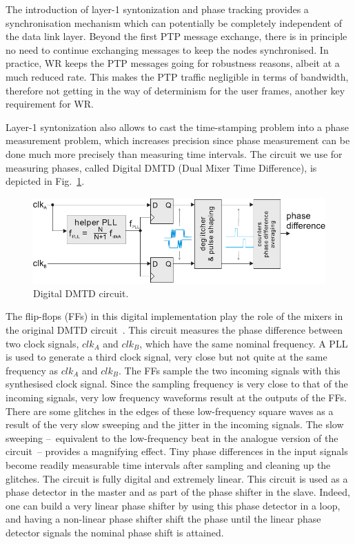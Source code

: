 \documentclass{../JAC2003}
\begin{document}
The introduction of layer-1 syntonization and phase tracking provides
a synchronisation mechanism which can potentially be completely
independent of the data link layer. Beyond the first PTP message
exchange, there is in principle no need to continue exchanging
messages to keep the nodes synchronised. In practice, WR keeps the PTP
messages going for robustness reasons, albeit at a much reduced
rate. This makes the PTP traffic negligible in terms of bandwidth,
therefore not getting in the way of determinism for the user frames,
another key requirement for WR. 

Layer-1 syntonization also allows to cast the time-stamping problem
into a phase measurement problem, which increases precision since
phase measurement can be done much more precisely than measuring time
intervals. The circuit we use for measuring phases, called Digital
DMTD (Dual Mixer Time Difference), is depicted in
Fig.~\ref{ddmtd-fig}.

\begin{figure}[htb]
   \centering
   \includegraphics*[width=\columnwidth]{misc/dmtd2.pdf}
   \caption{Digital DMTD circuit.}
   \label{ddmtd-fig}
\end{figure}

The flip-flops (FFs) in this digital implementation play the role of
the mixers in the original DMTD circuit~\cite{dmtd-ref}. This circuit
measures the phase difference between two clock signals, $clk_A$ and
$clk_B$, which have the same nominal frequency. A PLL is used to
generate a third clock signal, very close but not quite at the same
frequency as $clk_A$ and $clk_B$. The FFs sample the two incoming
signals with this synthesised clock signal. Since the sampling
frequency is very close to that of the incoming signals, very low
frequency waveforms result at the outputs of the FFs. There are some
glitches in the edges of these low-frequency square waves as a result
of the very slow sweeping and the jitter in the incoming signals. The
slow sweeping --~equivalent to the low-frequency beat in the analogue
version of the circuit~-- provides a magnifying effect. Tiny phase
differences in the input signals become readily measurable time
intervals after sampling and cleaning up the glitches. The circuit is
fully digital and extremely linear. This circuit is used as a phase
detector in the master and as part of the phase shifter in the
slave. Indeed, one can build a very linear phase shifter by using this
phase detector in a loop, and having a non-linear phase shifter shift
the phase until the linear phase detector signals the nominal phase
shift is attained.
\end{document}
